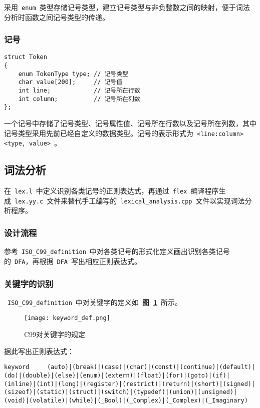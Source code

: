 \documentclass[lang=cn,11pt,a4paper]{paper}
\begin{document}
采用\ \lstinline{enum}\ 类型存储记号类型，建立记号类型与非负整数之间的映射，便于词法分析时函数之间记号类型的传递。

\subsubsection{记号}

\begin{lstlisting}
struct Token
{
    enum TokenType type; // 记号类型
    char value[200];     // 记号值
    int line;            // 记号所在行数
    int column;          // 记号所在列数
};
\end{lstlisting}

一个记号中存储了记号类型、记号属性值、记号所在行数以及记号所在列数，其中记号类型采用先前已经自定义的数据类型。记号的表示形式为\ \lstinline{<line:column><type, value>}\ 。

\subsection{词法分析}

在\ \lstinline{lex.l}\ 中定义识别各类记号的正则表达式，再通过\ \lstinline{flex}\ 编译程序生成\ \lstinline{lex.yy.c}\ 文件来替代手工编写的\ \lstinline{lexical_analysis.cpp}\ 文件以实现词法分析程序。

\subsubsection{设计流程}

参考\ \lstinline{ISO_C99_definition}\ 中对各类记号的形式化定义画出识别各类记号的\ \lstinline{DFA}，再根据\ \lstinline{DFA}\ 写出相应正则表达式。

\subsubsection{关键字的识别}

\ \lstinline{ISO_C99_definition}\ 中对关键字的定义如\ \textbf{图\ \ref{fig:C99对关键字的规定}}\ 所示。

\begin{figure}[!htb]
    \centering
    \texttt{[image: keyword\_def.png]}
    \caption{C99对关键字的规定}
    \label{fig:C99对关键字的规定}
\end{figure}

据此写出正则表达式：

\begin{lstlisting}
keyword		(auto)|(break)|(case)|(char)|(const)|(continue)|(default)|(do)|(double)|(else)|(enum)|(extern)|(float)|(for)|(goto)|(if)|(inline)|(int)|(long)|(register)|(restrict)|(return)|(short)|(signed)|(sizeof)|(static)|(struct)|(switch)|(typedef)|(union)|(unsigned)|(void)|(volatile)|(while)|(_Bool)|(_Complex)|(_Complex)|(_Imaginary)    
\end{lstlisting}
\end{document}
